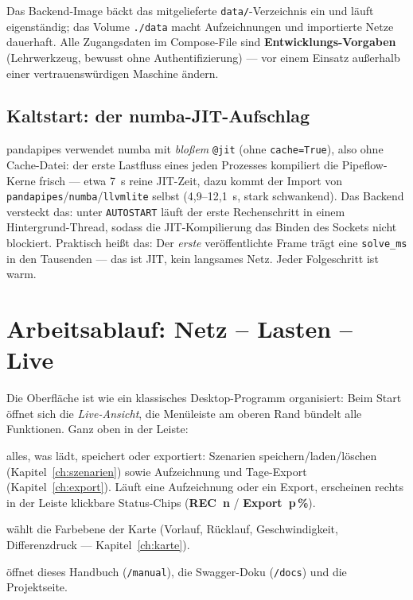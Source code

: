 \documentclass[11pt,a4paper,parskip=half]{scrreprt}
\newcommand{\ui}[1]{\textsf{\bfseries #1}}
\newcommand{\api}[1]{\texttt{#1}}
\begin{document}
Das Backend-Image bäckt das mitgelieferte \api{data/}-Verzeichnis ein und läuft
eigenständig; das Volume \api{./data} macht Aufzeichnungen und importierte Netze
dauerhaft. Alle Zugangsdaten im Compose-File sind \textbf{Entwicklungs-Vorgaben}
(Lehrwerkzeug, bewusst ohne Authentifizierung) --- vor einem Einsatz außerhalb
einer vertrauenswürdigen Maschine ändern.

\section{Kaltstart: der numba-JIT-Aufschlag}
\label{sec:kaltstart}

pandapipes verwendet numba mit \emph{bloßem} \texttt{@jit} (ohne
\texttt{cache=True}), also ohne Cache-Datei: der erste Lastfluss eines jeden
Prozesses kompiliert die Pipeflow-Kerne frisch --- etwa 7~s reine
JIT-Zeit, dazu kommt der Import von \texttt{pandapipes}/\texttt{numba}/\texttt{llvmlite}
selbst (4{,}9--12{,}1~s, stark schwankend). Das Backend versteckt das: unter
\texttt{AUTOSTART} läuft der erste Rechenschritt in einem Hintergrund-Thread,
sodass die JIT-Kompilierung das Binden des Sockets nicht blockiert. Praktisch
heißt das: Der \emph{erste} veröffentlichte Frame trägt eine \api{solve\_ms} in
den Tausenden --- das ist JIT, kein langsames Netz. Jeder Folgeschritt ist warm.

\chapter{Arbeitsablauf: Netz -- Lasten -- Live}
\label{ch:arbeitsablauf}

Die Oberfläche ist wie ein klassisches Desktop-Programm organisiert: Beim Start
öffnet sich die \emph{Live-Ansicht}, die Menüleiste am oberen Rand bündelt alle
Funktionen. Ganz oben in der Leiste:

\begin{description}[nosep]
  \item[\ui{Datei}] alles, was lädt, speichert oder exportiert: Szenarien
    speichern/laden/löschen (Kapitel~\ref{ch:szenarien}) sowie Aufzeichnung und
    Tage-Export (Kapitel~\ref{ch:export}). Läuft eine Aufzeichnung oder ein
    Export, erscheinen rechts in der Leiste klickbare Status-Chips
    (\ui{REC~n} / \ui{Export~p\,\%}).
  \item[\ui{Ansicht}] wählt die Farbebene der Karte (Vorlauf, Rücklauf,
    Geschwindigkeit, Differenzdruck --- Kapitel~\ref{ch:karte}).
  \item[\ui{Hilfe}] öffnet dieses Handbuch (\api{/manual}), die Swagger-Doku
    (\api{/docs}) und die Projektseite.
\end{description}
\end{document}
